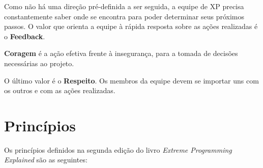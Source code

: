 \documentclass[a4paper,12pt,font=plain,header=plain]{abnt}
\begin{document}
	Como não há uma direção pré-definida a ser seguida, a equipe de XP precisa constantemente saber onde se encontra para poder determinar seus próximos passos. O valor que orienta a equipe à rápida resposta sobre as ações realizadas é o \textbf{Feedback}.
	
	\textbf{Coragem} é a ação efetiva frente à insegurança, para a tomada de decisões necessárias ao projeto.
	
	O último valor é o \textbf{Respeito}. Os membros da equipe devem se importar uns com os outros e com as ações realizadas.
	
	\section{Princípios}
	
	Os princípios definidos na segunda edição do livro \textit{Extreme Programming Explained}\cite{beck04} são as seguintes:
	
\end{document}
